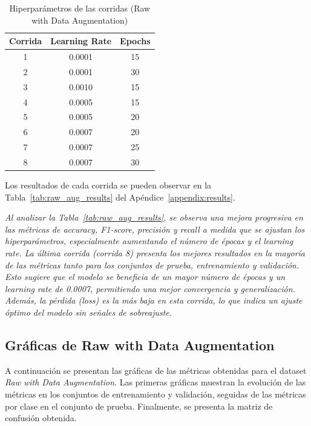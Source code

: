\documentclass[conference]{IEEEtran}
\begin{document}
\begin{table}[H]
\caption{Hiperparámetros de las corridas (Raw with Data Augmentation)}
\centering
\begin{tabular}{|c|c|c|}
\hline
\textbf{Corrida} & \textbf{Learning Rate} & \textbf{Epochs} \\
\hline
1 & 0.0001 & 15 \\
2 & 0.0001 & 30 \\
3 & 0.0010 & 15 \\
4 & 0.0005 & 15 \\
5 & 0.0005 & 20 \\
6 & 0.0007 & 20 \\
7 & 0.0007 & 25 \\
8 & 0.0007 & 30 \\
\hline
\end{tabular}
\label{tab:raw_aug_hparams}
\end{table}

Los resultados de cada corrida se pueden observar en la Tabla~\ref{tab:raw_aug_results} del Apéndice~\ref{appendix:results}.

\noindent\textit{
Al analizar la Tabla~\ref{tab:raw_aug_results}, se observa una mejora progresiva en las métricas de accuracy, F1-score, precisión y recall a medida que se ajustan los hiperparámetros, especialmente aumentando el número de épocas y el learning rate. La última corrida (corrida 8) presenta los mejores resultados en la mayoría de las métricas tanto para los conjuntos de prueba, entrenamiento y validación. Esto sugiere que el modelo se beneficia de un mayor número de épocas y un learning rate de 0.0007, permitiendo una mejor convergencia y generalización. Además, la pérdida (loss) es la más baja en esta corrida, lo que indica un ajuste óptimo del modelo sin señales de sobreajuste.
}

\subsection{Gráficas de Raw with Data Augmentation}

A continuación se presentan las gráficas de las métricas obtenidas para el dataset \textit{Raw with Data Augmentation}. Las primeras gráficas muestran la evolución de las métricas en los conjuntos de entrenamiento y validación, seguidas de las métricas por clase en el conjunto de prueba. Finalmente, se presenta la matriz de confusión obtenida.

\end{document}
